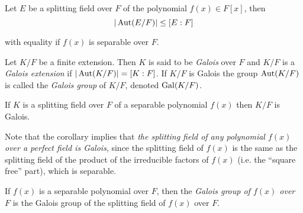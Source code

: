 \documentclass[a4paper]{article}
\begin{document}
\begin{prop}
    Let $E$ be a splitting field over $F$ of the polynomial $f(x) \in F[x]$, then
    \[
        |\operatorname{Aut}(E/F)| \leq [E : F]
    \]

    with equality if $f(x)$ is separable over $F$.
\end{prop}

\begin{defi}
    Let $K/F$ be a finite extension. Then $K$ is said to be \emph{Galois} over $F$ and $K/F$ is a \emph{Galois extension} if $|\operatorname{Aut}(K/F)| = [K : F]$. If $K/F$ is Galois the group $\operatorname{Aut}(K/F)$ is called the \emph{Galois group} of $K/F$, denoted $\operatorname{Gal}(K/F)$.
\end{defi}

\begin{cor}
    If $K$ is a splitting field over $F$ of a separable polynomial $f(x)$ then $K/F$ is Galois.
\end{cor}

Note that the corollary implies that \emph{the splitting field of any polynomial $f(x)$ over a perfect field is Galois}, since the splitting field of $f(x)$ is the same as the splitting field of the product of the irreducible factors of $f(x)$ (i.e. the ``square free'' part), which is separable.

\begin{defi}
    If $f(x)$ is a separable polynomial over $F$, then the \emph{Galois group of $f(x)$ over $F$} is the Galois group of the splitting field of $f(x)$ over $F$.
\end{defi}
\end{document}
